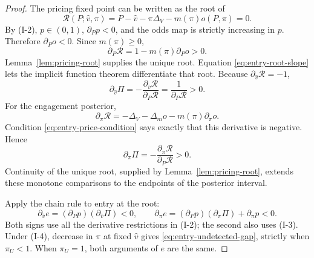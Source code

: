 \begin{proof}
The pricing fixed point can be written as the root of
\begin{equation}
\label{eq:entry-root-residual}
  \mathcal R(P;\widehat v,\pi)
  =P-\widehat v-\pi\Delta_V-m(\pi)o(P,\pi)=0.
\end{equation}
By (I-2), $p\in(0,1)$, $\partial_Pp<0$, and the odds map is strictly increasing in $p$.
Therefore $\partial_Po<0$. Since $m(\pi)\ge0$,
\begin{equation}
\label{eq:entry-root-slope}
  \partial_P\mathcal R=1-m(\pi)\partial_Po>0.
\end{equation}
Lemma~\ref{lem:pricing-root} supplies the unique root. Equation
\eqref{eq:entry-root-slope} lets the implicit function theorem differentiate that root.
Because $\partial_{\widehat v}\mathcal R=-1$,
\[
  \partial_{\widehat v}\Pi
  =-\frac{\partial_{\widehat v}\mathcal R}{\partial_P\mathcal R}
  =\frac{1}{\partial_P\mathcal R}>0.
\]
For the engagement posterior,
\[
  \partial_\pi \mathcal R
  =-\Delta_V-\Delta_mo-m(\pi)\partial_\pi o.
\]
Condition \eqref{eq:entry-price-condition} says exactly that this derivative is negative. Hence
\[
  \partial_\pi\Pi
  =-\frac{\partial_\pi \mathcal R}{\partial_P\mathcal R}>0.
\]
Continuity of the unique root, supplied by Lemma~\ref{lem:pricing-root}, extends these monotone
comparisons to the endpoints of the posterior interval.

Apply the chain rule to entry at the root:
\[
  \partial_{\widehat v}e
  =(\partial_Pp)(\partial_{\widehat v}\Pi)<0,
  \qquad
  \partial_\pi e
  =(\partial_Pp)(\partial_\pi\Pi)+\partial_\pi p<0.
\]
Both signs use all the derivative restrictions in (I-2); the second also uses (I-3). Under (I-4),
decrease in $\pi$ at fixed $\widehat v$ gives \eqref{eq:entry-undetected-gap}, strictly when
$\pi_U<1$. When $\pi_U=1$, both arguments of $e$ are the same.
\end{proof}
